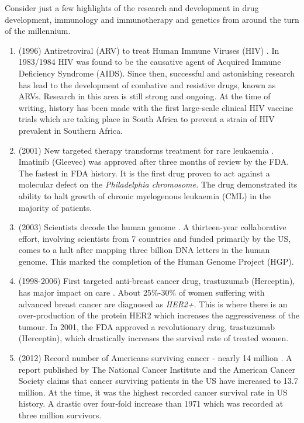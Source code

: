 Consider just a few highlights of the research and development in drug development, immunology and immunotherapy and genetics from around the turn of the millennium.
\begin{enumerate}
	\item (1996) Antiretroviral (ARV) to treat Human Immune Viruses (HIV) \citep{Lange2014}. 
	In 1983/1984 HIV was found to be the causative agent of Acquired Immune Deficiency Syndrome (AIDS). Since then, successful and astonishing research has lead to the development of combative and resistive drugs, known as ARVs. Research in this area is still strong and ongoing. At the time of writing, history has been made with the first large-scale clinical HIV vaccine trials which are taking place in South Africa to prevent a strain of HIV prevalent in Southern Africa.
	
	\item (2001) New targeted therapy transforms treatment for rare leukaemia  \citep{Druker2001}.
	Imatinib (Gleevec) was approved after three months of review by the FDA. The fastest in FDA history. It is the first drug proven to act against a molecular defect on the \textit{Philadelphia chromosome.} The drug demonstrated its ability to halt growth of chronic myelogenous leukaemia  (CML) in the majority of patients.
	
	\item (2003) Scientists decode the human genome \citep{HGP2013}. A thirteen-year collaborative effort, involving scientists from 7 countries and funded primarily by the US, comes to a halt after mapping three billion DNA letters in the human genome. This marked the completion of the Human Genome Project (HGP).
	
	\item (1998-2006) First targeted anti-breast cancer drug, trastuzumab (Herceptin), has major impact on care \citep{Slamon2001}. About 25\%-30\% of women suffering with advanced breast cancer are diagnosed as \textit{HER2+}. This is where there is an over-production of the protein HER2 which increases the aggressiveness of the tumour. In 2001, the FDA approved a revolutionary drug, trastuzumab (Herceptin), which drastically increases the survival rate of treated women.

	\item (2012) Record number of Americans surviving cancer - nearly 14 million \citep{MMWR2011}.
	A report published by The National Cancer Institute and the American Cancer Society claims that cancer surviving patients in the US have increased to 13.7 million. At the time, it was the highest recorded cancer survival rate in US history. A drastic over four-fold increase than 1971 which was recorded at three million survivors.
\end{enumerate}

